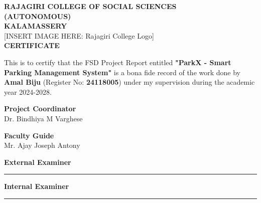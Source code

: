 \begin{titlepage}
\begin{center}
    {\fontsize{18pt}{22pt}\selectfont \textbf{RAJAGIRI COLLEGE OF SOCIAL SCIENCES}}\\[0.2cm]
    {\fontsize{16pt}{20pt}\selectfont \textbf{(AUTONOMOUS)}}\\[0.2cm]
    {\fontsize{16pt}{20pt}\selectfont \textbf{KALAMASSERY}}\\[1cm]
    
    [INSERT IMAGE HERE: Rajagiri College Logo]\\[1cm]
    
    {\fontsize{18pt}{22pt}\selectfont \textbf{CERTIFICATE}}\\[1cm]
\end{center}

\noindent
This is to certify that the FSD Project Report entitled \textbf{"ParkX - Smart Parking Management System"} is a bona fide record of the work done by \textbf{Amal Biju} (Register No: \textbf{24118005}) under my supervision during the academic year 2024-2028.

\vfill

\noindent
\begin{minipage}[t]{0.5\textwidth}
\raggedright
\textbf{Project Coordinator} \\
Dr. Bindhiya M Varghese
\end{minipage}
\hfill
\begin{minipage}[t]{0.45\textwidth}
\raggedleft
\textbf{Faculty Guide} \\
Mr. Ajay Joseph Antony
\end{minipage}

\vspace{3cm}

\noindent
\begin{minipage}[t]{0.5\textwidth}
\raggedright
\textbf{External Examiner} \\
\rule{5cm}{0.4pt}
\end{minipage}
\hfill
\begin{minipage}[t]{0.45\textwidth}
\raggedleft
\textbf{Internal Examiner} \\
\rule{5cm}{0.4pt}
\end{minipage}
\end{titlepage}
